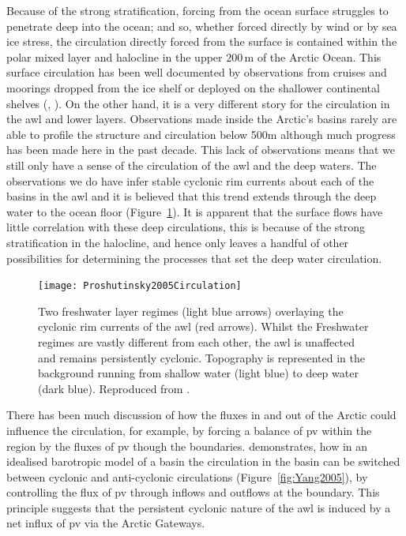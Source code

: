 \documentclass[12pt,a4paper]{report}
\newcommand*\figref[1]{Figure~\ref{#1}}
\begin{document}
Because of the strong stratification, forcing from the ocean surface 
struggles to penetrate deep into the ocean; and so, whether forced directly by wind 
or by sea ice stress, the circulation
directly forced from the surface is contained within the polar mixed layer 
and halocline in the upper $200\,\mathrm{m}$ of the Arctic Ocean. 
This surface circulation has been well documented by observations
from cruises and moorings  dropped  from  the  ice  shelf  or  deployed  on 
the  shallower  continental  shelves (\cite{gerdes1997large}, \cite{jones2001circulation}). On the other hand, it is a very different
story for the circulation in the \gls{awl} and lower layers. Observations made
inside the Arctic's basins rarely are able to profile the structure  and
circulation  below 500m  although much progress has been made here in the
past decade. This lack of observations means that  we  still only have  a  sense  of  the circulation 
of the \gls{awl} and the deep  waters.  The  observations  we  do 
have  infer stable cyclonic  rim  currents about each of the basins in the
\gls{awl} and it is believed that this trend extends through the deep water to the 
ocean floor (\figref{fig:Proshutinsky2005Circulation}).  It is apparent that the surface flows have little correlation with these deep circulations, this is because of the 
strong stratification in the halocline, and hence only leaves a handful of other possibilities for determining the processes that set the deep water circulation.


\begin{figure}
	\centering
	\texttt{[image: Proshutinsky2005Circulation]}
	\caption[\cite{proshutinsky2005arctic}]{ Two freshwater layer regimes (light 
		blue arrows) overlaying the cyclonic rim currents of the \gls{awl} (red arrows).
		Whilst the Freshwater regimes are vastly different from each other, the
		\gls{awl} is unaffected and remains persistently cyclonic.
		Topography is represented in the background running from 
		shallow water (light blue) to deep water (dark blue).  Reproduced from \cite{proshutinsky2005arctic}.}
	\label{fig:Proshutinsky2005Circulation}
\end{figure}

There has been much discussion
of how the fluxes in and out of the Arctic could influence the circulation,
for example, by forcing a balance of \gls{pv} within the region by
the fluxes of \gls{pv} though the boundaries. \cite{yang2005arctic} demonstrates, how 
in an idealised barotropic model of a basin the circulation in the basin can be switched between cyclonic and
anti-cyclonic circulations (\figref{fig:Yang2005}), by controlling the flux 
of \gls{pv} through inflows and outflows
at the boundary. This principle suggests
that the persistent cyclonic nature of the \gls{awl} is induced by a 
net influx of \gls{pv} via the Arctic Gateways. 
\end{document}
